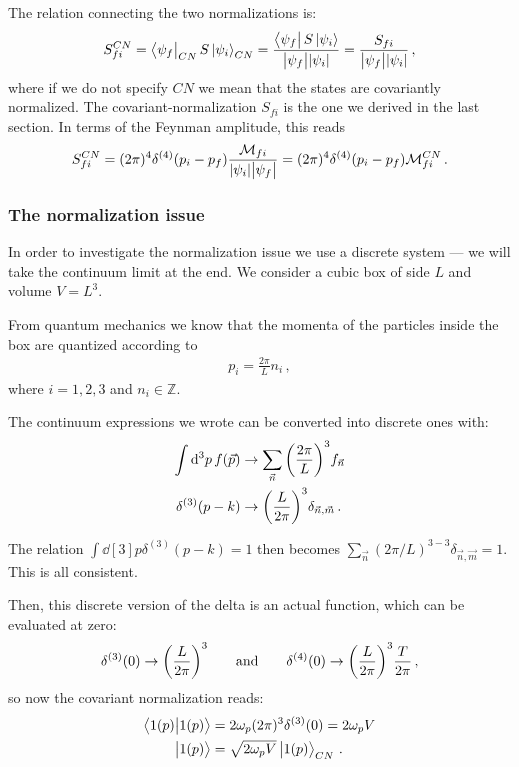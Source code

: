 \documentclass[main.tex]{subfiles}
\begin{document}
The relation connecting the two normalizations is: 
%
\begin{align}
S^{CN}_{fi} = \bra{\psi_{f}}_{CN} S \ket{\psi_{i}}_{CN}
= \frac{\bra{\psi_{f}} S \ket{\psi_{i}}}{\abs{\psi_{f}} \abs{\psi_{i}}} = \frac{S_{fi}}{\abs{\psi_{f}} \abs{\psi_{i}}}
\,,
\end{align}
%
where if we do not specify \(CN\) we mean that the states are covariantly normalized. 
The covariant-normalization \(S_{fi}\) is the one we derived in the last section. 
In terms of the Feynman amplitude, this reads 
%
\begin{align}
S^{CN}_{fi} = (2 \pi )^{4} \delta^{(4)} (p_i - p_f)
\frac{\mathcal{M}_{fi}}{\abs{\psi_{i}} \abs{\psi_{f}}}
= (2 \pi )^{4} \delta^{(4)} (p_i - p_f) \mathcal{M}_{fi}^{CN}
\,.
\end{align}

\subsubsection{The normalization issue}

In order to investigate the normalization issue we use a discrete system --- we will take the continuum limit at the end. 
We consider a cubic box of side \(L\) and volume \(V = L^3\).

From quantum mechanics we know that the momenta of the particles inside the box are quantized according to 
%
\begin{align}
p_{i} = \frac{2 \pi }{L} n_i
\,,
\end{align}
%
where \(i = 1, 2, 3\) and \(n_i \in \mathbb{Z}\). 

The continuum expressions we wrote can be converted into discrete ones with: 
%
\begin{align}
\int \dd[3]{p} f (\vec{p})  &\to \sum _{\vec{n}} \qty(\frac{2 \pi }{L})^3 f_{\vec{n}}  \\
\delta^{(3)} (p-k) & \to \qty(\frac{L}{2 \pi })^3 \delta_{\vec{n}, \vec{m}}
\,.
\end{align}

The relation \(\int \dd[3]{p } \delta^{(3)} (p-k) = 1\) then becomes \(\sum _{\vec{n}} (2\pi / L)^{3-3} \delta_{\vec{n}, \vec{m}}  = 1\). 
This is all consistent. 

Then, this discrete version of the delta is an actual function, which can be evaluated at zero: 
%
\begin{align}
\delta^{(3)}(0) \to \qty( \frac{L}{2 \pi })^{3}
\qquad \text{and} \qquad
\delta^{(4)}(0) \to \qty( \frac{L}{2 \pi })^{3} \frac{T}{2 \pi }
\,,
\end{align}
%
so now the covariant normalization reads: 
%
\begin{align}
\braket{1(p)}{1(p)} &= 2 \omega_{p} (2 \pi )^3 \delta^{(3)}(0) = 2 \omega_{p} V  \\
\ket{1(p)} &= \sqrt{2 \omega_{p} V} \ket{1(p)}_{CN}
\,.
\end{align}
\end{document}
